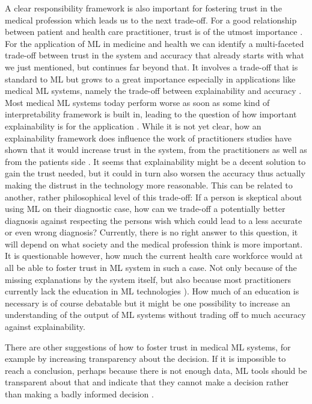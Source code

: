 A clear responsibility framework is also important for fostering trust in the medical profession which leads us to the next trade-off. For a good relationship between patient and health care practitioner, trust is of the utmost importance \cite{clark2002trust}. For the application of ML in medicine and health we can identify a multi-faceted trade-off between trust in the system and accuracy that already starts with what we just mentioned, but continues far beyond that. It involves a trade-off that is standard to ML but grows to a great importance especially in applications like medical ML systems, namely the trade-off between explainability and accuracy \cite{topol2019high, kelly2019key}. Most medical ML systems today perform worse as soon as some kind of interpretability framework is built in, leading to the question of how important explainability is for the application \cite{luo2019balancing}. While it is not yet clear, how an explainability framework does influence the work of practitioners studies have shown that it would increase trust in the system, from the practitioners as well as from the patients side \cite{diprose2020physician, topol2019high}. It seems that explainability might be a decent solution to gain the trust needed, but it could in turn also worsen the accuracy thus actually making the distrust in the technology more reasonable.
This can be related to another, rather philosophical level of this trade-off: If a person is skeptical about using ML on their diagnostic case, how can we trade-off a potentially better diagnosis against respecting the persons wish which could lead to a less accurate or even wrong diagnosis? Currently, there is no right answer to this question, it will depend on what society and the medical profession think is more important. It is questionable however, how much the current health care workforce would at all be able to foster trust in ML system in such a case. Not only because of the missing explanations by the system itself, but also because most practitioners currently lack the education in ML technologies \cite{he2019practical}). How much of an education is necessary is of course debatable but it might be one possibility to increase an understanding of the output of ML systems without trading off to much accuracy against explainability.

There are other suggestions of how to foster trust in medical ML systems, for example by increasing transparency about the decision. If it is impossible to reach a conclusion, perhaps because there is not enough data, ML tools should be transparent about that and indicate that they cannot make a decision rather than making a badly informed decision \cite{horgan2019artificial}. 


